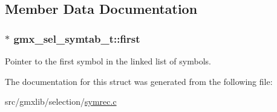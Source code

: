 \subsection{\-Member \-Data \-Documentation}
\hypertarget{structgmx__sel__symtab__t_a58897a693e237309c988015ea7249bfd}{
\subsubsection[{first}]{$\ast$ {\bf gmx\-\_\-sel\-\_\-symtab\-\_\-t\-::first}}}\label{structgmx__sel__symtab__t_a58897a693e237309c988015ea7249bfd}
\-Pointer to the first symbol in the linked list of symbols. 

\-The documentation for this struct was generated from the following file\-:\begin{DoxyCompactItemize}
\item 
src/gmxlib/selection/\hyperlink{symrec_8c}{symrec.\-c}\end{DoxyCompactItemize}
